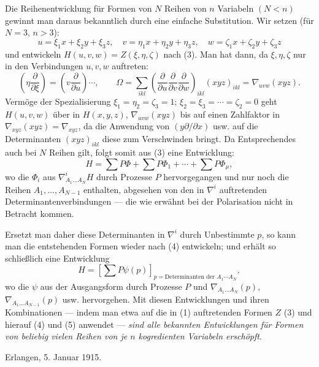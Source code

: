 Die Reihenentwicklung für Formen von $N$ Reihen von $n$ Variabeln $(N<n)$ gewinnt man daraus bekanntlich durch eine einfache Substitution. Wir setzen (für $N=3$, $n>3$):
\[
  u=\xi_1x+\xi_2y+\xi_3z,
  \quad v=\eta_1x+\eta_2y+\eta_3z,
  \quad w=\zeta_1x+\zeta_2y+\zeta_3z
\]
und entwickeln $H(u,v,w)=Z(\xi,\eta,\zeta)$ nach (3). Man hat dann, da $\xi,\eta,\zeta$ nur in den Verbindungen $u,v,w$ auftreten:
\[
  \left(\eta\frac{\partial}{\partial \xi}\right)=
  \left(v\frac{\partial}{\partial u}\right)\cdots,
  \qquad
  \Omega=\sum_{ikl}\left(\frac{\partial}{\partial u}
  \frac{\partial}{\partial v}
  \frac{\partial}{\partial w}\right)_{ikl}(xyz)_{ikl}
  =\nabla_{uvw}(xyz).
\]
Vermöge der Spezialisierung $\xi_1=\eta_2=\zeta_3=1$; $\xi_2=\xi_3=\cdots=\zeta_2=0$ geht $H(u,v,w)$ über in $H(x,y,z)$, $\nabla_{uvw}(xyz)$ bis auf einen Zahlfaktor in $\nabla_{xyz}(xyz)=\nabla_{xyz}$, da die Anwendung von $(y\partial/\partial x)$ usw. auf die Determinanten $(xyz)_{ikl}$ diese zum Verschwinden bringt. Da Entsprechendes auch bei $N$ Reihen gilt, folgt somit aus (3) eine Entwicklung:
\begin{equation}
  H=\sum P\Phi+\sum P\Phi_1+\cdots+\sum P\Phi_\mu,
\tag{4}
\end{equation}
wo die $\Phi_i$ aus $\nabla^i_{A_1\ldots A_N}H$ durch Prozesse $P$ hervorgegangen und nur noch die Reihen $A_1,
\ldots,A_{N-1}$ enthalten, abgesehen von den in $\nabla^i$ auftretenden Determinantenverbindungen --- die wie erwähnt bei der Polarisation nicht in Betracht kommen.

Ersetzt man daher diese Determinanten in $\nabla^i$ durch Unbestimmte $p$, so kann man die entstehenden Formen wieder nach (4) entwickeln; und erhält so schließlich eine Entwicklung
\begin{equation}
  H=\left[\sum P\psi(p)\right]_{p=\text{Determinanten der }A_1\cdots A_N},
\tag{5}
\end{equation}
wo die $\psi$ aus der Ausgangsform durch Prozesse $P$ und $\nabla_{A_1\ldots A_N}(p)$, $\nabla_{A_1\ldots A_{N-1}}(p)$ usw. hervorgehen. Mit diesen Entwicklungen und ihren Kombinationen --- indem man etwa auf die in (1) auftretenden Formen $Z$ (3) und hierauf (4) und (5) anwendet --- \emph{sind alle bekannten Entwicklungen für Formen von beliebig vielen Reihen von je $n$ kogredienten Variabeln erschöpft}.

Erlangen, 5. Januar 1915.
